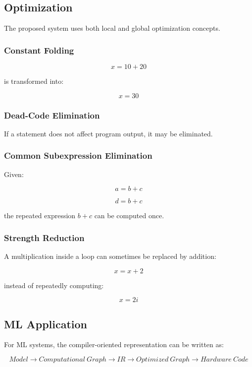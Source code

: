 \documentclass[12pt,a4paper]{article}
\begin{document}
\subsection{Optimization}

The proposed system uses both local and global optimization concepts.

\subsubsection{Constant Folding}

\[
x=10+20
\]

is transformed into:

\[
x=30
\]

\subsubsection{Dead-Code Elimination}

If a statement does not affect program output, it may be eliminated.

\subsubsection{Common Subexpression Elimination}

Given:

\[
a=b+c
\]

\[
d=b+c
\]

the repeated expression $b+c$ can be computed once.

\subsubsection{Strength Reduction}

A multiplication inside a loop can sometimes be replaced by addition:

\[
x=x+2
\]

instead of repeatedly computing:

\[
x=2i
\]

\subsection{ML Application}

For ML systems, the compiler-oriented representation can be written as:

\[
Model \rightarrow Computational\ Graph
\rightarrow IR \rightarrow Optimized\ Graph
\rightarrow Hardware\ Code
\]
\end{document}
